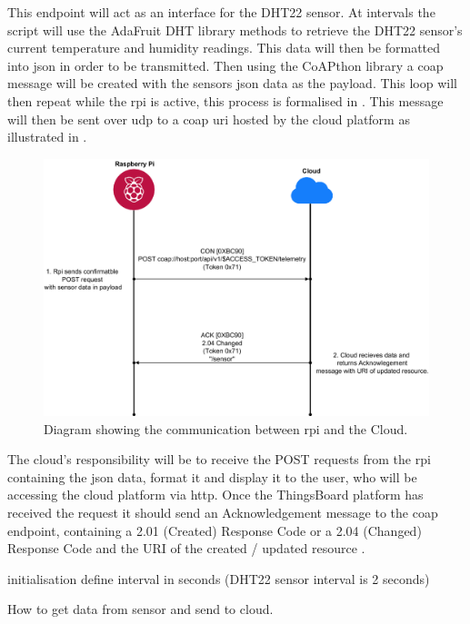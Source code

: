 This endpoint will act as an interface for the DHT22 sensor. 
At intervals the script will use the AdaFruit DHT library methods to retrieve the DHT22 sensor's current
temperature and humidity readings. This data will then be formatted into \gls{json}
in order to be transmitted. Then using the CoAPthon library a \gls{coap} 
message will be created with the sensors \gls{json} data as the payload. 
This loop will then repeat while the \gls{rpi} is active, this process is 
formalised in .
This message will then be sent over \gls{udp} to a \gls{coap} \gls{uri} 
hosted by the cloud platform as illustrated in .

\begin{figure}[H]
    \centering
    \includegraphics[width=\imageWidth\textwidth]{assets/rpi_cloud_communication.png}
    \caption{\label{fig:rpi_cloud_comms} Diagram showing the communication between \gls{rpi} and the Cloud.}
\end{figure}

The cloud's responsibility will be to receive the POST requests from the 
\gls{rpi} containing the \gls{json} data, format it and display it 
to the user, who will be accessing the cloud platform via \gls{http}. 
Once the ThingsBoard platform has received the request it should send an Acknowledgement message to the \gls{coap} endpoint, 
containing a 2.01 (Created) Response Code or a 2.04 (Changed) Response Code 
and the URI of the created / updated resource \citep{shelby_constrained_2014}. 

\begin{center}
\begin{algorithm}[htbp]
    initialisation\;
    define interval in seconds (DHT22 sensor interval is 2 seconds)\;
    \caption{\label{alg:get_send_data_alg}How to get data from sensor and send to cloud.}
\end{algorithm}
\end{center}

